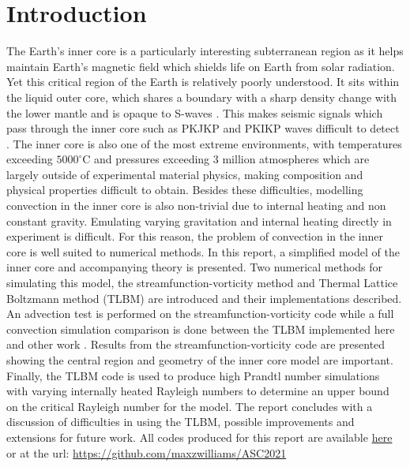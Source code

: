 \documentclass{article}
\begin{document}
\section*{Introduction}
The Earth's inner core is a particularly interesting subterranean region as it helps maintain Earth's magnetic field which shields life on Earth from
solar 
radiation. Yet this critical region of the Earth is relatively poorly understood. It sits within the liquid outer core, which shares a boundary with a sharp 
density change with the lower mantle and is opaque to S-waves \cite{fowler1990solid}. This makes seismic signals which pass through the inner core such 
as PKJKP and PKIKP waves difficult to detect \cite{tkalvcic2018shear, bolt1970pdp}. The inner core is also one of the most extreme environments, with 
temperatures exceeding $5000^{\circ}$C and pressures exceeding 3 million atmospheres which are 
largely outside of experimental material physics, making composition and physical properties difficult to obtain. Besides these difficulties, modelling 
convection in the inner core is also non-trivial due to internal heating and non constant gravity. Emulating varying gravitation and internal heating 
directly in experiment is difficult. For this reason, the problem of convection in the inner core is well suited to numerical methods. 
\newline
\noindent In this report, a simplified model of the inner core and accompanying theory is presented. Two numerical methods for simulating this model, the streamfunction-vorticity method and Thermal Lattice Boltzmann method (TLBM) are introduced
and their implementations described. An advection test is performed on the streamfunction-vorticity code while a full convection simulation comparison is done between the TLBM 
implemented here and other work \cite{mora2017simulation}. Results from the streamfunction-vorticity code are presented showing the central region and geometry of the inner core model are important.
Finally, the TLBM code is used to produce high Prandtl number simulations with varying internally heated Rayleigh numbers to determine an upper bound on the critical Rayleigh number
for the model. The report concludes with a discussion of difficulties in using the TLBM, possible improvements and extensions for future work.
\vspace{0.3cm}
\newline
\noindent All codes produced for this report are available \href{https://github.com/maxzwilliams/ASC2021}{here} or at the url: \url{https://github.com/maxzwilliams/ASC2021}
\end{document}
